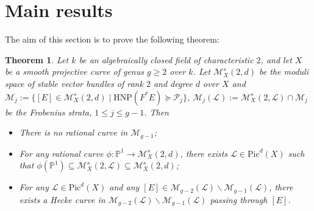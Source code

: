 \documentclass{kms-b}
\numberwithin{equation}{section}
\theoremstyle{plain}
\newtheorem{theorem}{Theorem}[section]
\theoremstyle{definition}
\theoremstyle{remark}
\begin{document}
\section{Main results}\label{sec4}
The aim of this section is to prove the following theorem: 
\begin{theorem}
Let $k$ be an algebraically closed field of characteristic $2$, and let $X$ be a smooth projective curve of genus $g\geqslant 2$ over $k$. Let $\mathcal{M}^s_X(2,d)$ be the moduli space of stable vector bundles of rank $2$ and degree $d$ over $X$ and $\mathcal{M}_j:=\{ [E]\in \mathcal{M}_X^s(2,d) \mid \mathrm{HNP}(F^*E) \succcurlyeq \mathscr{P}_j \}$, $\mathcal{M}_j(\mathcal{L}):=\mathcal{M}^s_X(2,\mathcal{L}) \cap \mathcal{M}_j$ be the Frobenius strata,  $1\leqslant j \leqslant g-1$. Then
\begin{itemize}
    \item [(1)] There is no rational curve in $\mathcal{M}_{g-1}$;
    \item[(2)] For any rational curve $\phi: \mathbb{P}^1 \to \mathcal{M}^s_X(2,d)$, there exists $\mathcal{L} \in \mathrm{Pic}^d(X)$ such that $\phi(\mathbb{P}^1) \subseteq \mathcal{M}^s_X(2,\mathcal{L}) \subseteq \mathcal{M}^s_X(2,d)$;
    \item[(3)] For any $\mathcal{L}\in \mathrm{Pic}^d(X)$ and any $[E] \in \mathcal{M}_{g-2}(\mathcal{L}) \backslash \mathcal{M}_{g-1}(\mathcal{L})$, there exists a Hecke curve in $\mathcal{M}_{g-2}(\mathcal{L})\backslash \mathcal{M}_{g-1}(\mathcal{L})$ passing through $[E]$.
\end{itemize}
\end{theorem}
\end{document}

